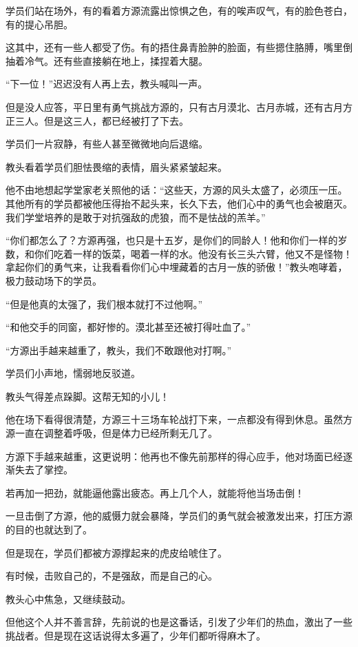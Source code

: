 \begin{this_body}
学员们站在场外，有的看着方源流露出惊惧之色，有的唉声叹气，有的脸色苍白，有的提心吊胆。

这其中，还有一些人都受了伤。有的捂住鼻青脸肿的脸面，有些摁住胳膊，嘴里倒抽着冷气。还有些直接躺在地上，揉捏着大腿。

“下一位！”迟迟没有人再上去，教头喊叫一声。

但是没人应答，平日里有勇气挑战方源的，只有古月漠北、古月赤城，还有古月方正三人。但是这三人，都已经被打了下去。

学员们一片寂静，有些人甚至微微地向后退缩。

教头看着学员们胆怯畏缩的表情，眉头紧紧皱起来。

他不由地想起学堂家老关照他的话：“这些天，方源的风头太盛了，必须压一压。其他所有的学员都被他压得抬不起头来，长久下去，他们心中的勇气也会被磨灭。我们学堂培养的是敢于对抗强敌的虎狼，而不是怯战的羔羊。”

“你们都怎么了？方源再强，也只是十五岁，是你们的同龄人！他和你们一样的岁数，和你们吃着一样的饭菜，喝着一样的水。他没有长三头六臂，他又不是怪物！拿起你们的勇气来，让我看看你们心中埋藏着的古月一族的骄傲！”教头咆哮着，极力鼓动场下的学员。

“但是他真的太强了，我们根本就打不过他啊。”

“和他交手的同窗，都好惨的。漠北甚至还被打得吐血了。”

“方源出手越来越重了，教头，我们不敢跟他对打啊。”

学员们小声地，懦弱地反驳道。

教头气得差点跺脚。这帮无知的小儿！

他在场下看得很清楚，方源三十三场车轮战打下来，一点都没有得到休息。虽然方源一直在调整着呼吸，但是体力已经所剩无几了。

方源下手越来越重，这更说明：他再也不像先前那样的得心应手，他对场面已经逐渐失去了掌控。

若再加一把劲，就能逼他露出疲态。再上几个人，就能将他当场击倒！

一旦击倒了方源，他的威慑力就会暴降，学员们的勇气就会被激发出来，打压方源的目的也就达到了。

但是现在，学员们都被方源撑起来的虎皮给唬住了。

有时候，击败自己的，不是强敌，而是自己的心。

教头心中焦急，又继续鼓动。

但他这个人并不善言辞，先前说的也是这番话，引发了少年们的热血，激出了一些挑战者。但是现在这话说得太多遍了，少年们都听得麻木了。


\end{this_body}
